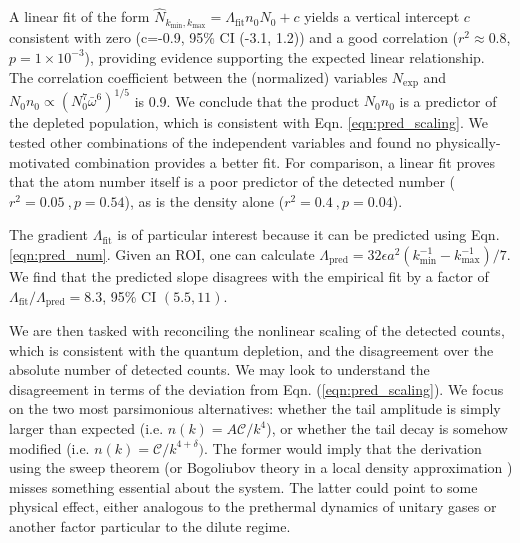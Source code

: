 	


	A linear fit of the form $\hat{N}_{k_\textrm{min},k_\textrm{max}} = \Lambda_\textrm{fit} n_0 N_0 + c$ yields a vertical intercept $c$ consistent with zero (c=-0.9,  95\% CI (-3.1, 1.2)) and a good correlation ($r^2\approx0.8$, $p=1\times10^{-3}$), providing evidence supporting the expected linear relationship. 
	The correlation coefficient between the (normalized) variables $N_\textrm{exp}$ and $N_0n_0\propto(N_0^7\bar{\omega}^6)^{1/5}$ is 0.9.
	We conclude that the product $N_0n_0$ is a predictor of the depleted population, which is consistent with Eqn. \ref{eqn:pred_scaling}.
	We tested other combinations of the independent variables and found no physically-motivated combination provides a better fit.
	For comparison, a linear fit proves that the atom number itself is a poor predictor of the detected number ($r^2=0.05~,p=0.54$), as is the density alone ($r^2=0.4~,p=0.04$).

	The gradient $\Lambda_\textrm{fit}$ is of particular interest because it can be predicted using Eqn. \ref{eqn:pred_num}.
	Given an ROI, one can calculate $\Lambda_\textrm{pred} = 32 \epsilon a^2(k_{\textrm{min}}^{-1}-k_{\textrm{max}}^{-1})/7$.
	We find that the predicted slope disagrees with the empirical fit by a factor of $\Lambda_\textrm{fit}/\Lambda_\textrm{pred}= 8.3$, 95\% CI $(5.5,11)$.


	We are then tasked with reconciling the nonlinear scaling of the detected counts, which is consistent with the quantum depletion, and the disagreement over the absolute number of detected counts.
	We may look to understand the disagreement in terms of the deviation from Eqn. (\ref{eqn:pred_scaling}).
	We focus on the two most parsimonious alternatives: whether the tail amplitude is simply larger than expected (i.e. $n(k)=A\mathcal{C}/k^4$), or whether the tail decay is somehow modified (i.e. $n(k)=\mathcal{C}/k^{4+\delta})$.
	The former would imply that the derivation using the sweep theorem (or Bogoliubov theory in a local density approximation \cite{Chang16}) misses something essential about the system.
	The latter could point to some physical effect, either analogous to the prethermal dynamics of unitary gases \cite{Makotyn14,Eigen18,Colussi20,Kira15_coherent,Smith14} or another factor particular to the dilute regime.
	
